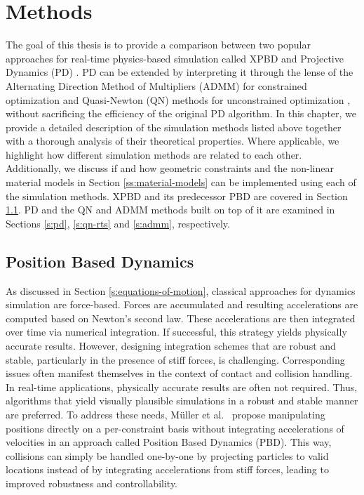 \chapter{Methods}\label{ch:method}

The goal of this thesis is to provide a comparison between two popular approaches for real-time physics-based simulation called XPBD \cite{macklin2016}
and Projective Dynamics (PD) \cite{bouaziz2014}. PD can be extended by interpreting it through the lense of the Alternating 
Direction Method of Multipliers (ADMM) for constrained optimization \cite{overby2017} and Quasi-Newton (QN) methods for unconstrained 
optimization \cite{liu2017}, without sacrificing the efficiency of the original PD algorithm. In this chapter, we provide a detailed 
description of the simulation methods listed above together with a thorough analysis of their theoretical properties. Where applicable, 
we highlight how different simulation methods are related to each other. Additionally, we discuss if and how geometric constraints and the 
non-linear material models in Section \ref{ss:material-models} can be implemented using each of the simulation methods. XPBD and its 
predecessor PBD are covered in Section \ref{s:pbd}. PD and the QN and ADMM methods built on top of it are examined in Sections \ref{s:pd}, 
\ref{s:qn-rts} and \ref{s:admm}, respectively.

\section{Position Based Dynamics}\label{s:pbd}
As discussed in Section \ref{s:equations-of-motion}, classical approaches for dynamics simulation are force-based. Forces are accumulated and 
resulting accelerations are computed based on Newton's second law. These accelerations are then integrated over time via numerical integration. 
If successful, this strategy yields physically accurate results. However, designing integration schemes that are robust and stable,
particularly in the presence of stiff forces, is challenging. Corresponding issues often manifest themselves in the context of contact and collision 
handling. In real-time applications, physically accurate results are often not required. Thus, algorithms that yield visually
plausible simulations in a robust and stable manner are preferred. To address these needs, Müller et al.\ \cite{mueller2006} propose manipulating
positions directly on a per-constraint basis without integrating accelerations of velocities in an approach called Position Based Dynamics (PBD).
This way, collisions can simply be handled one-by-one by projecting particles to valid locations instead of by integrating accelerations from 
stiff forces, leading to improved robustness and controllability. 

